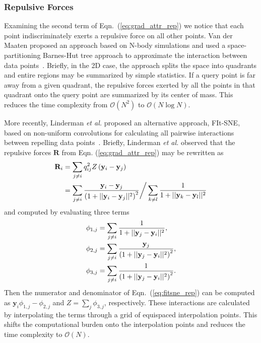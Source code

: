 \documentclass[twocolumn]{bmcart}
\begin{document}
\subsubsection*{Repulsive Forces}

Examining the second term of Eqn.~(\ref{eq:grad_attr_rep}) we notice that each
point indiscriminately exerts a repulsive force on all other points. Van der
Maaten proposed an approach based on N-body simulations and used a
space-partitioning Barnes-Hut tree approach to approximate the interaction
between data points~\cite{van2014accelerating}. Briefly, in the 2D case, the approach splits
the space into quadrants and entire regions may be summarized by simple statistics.
If a query point is far away from a given quadrant, the repulsive forces exerted
by all the points in that quadrant onto the query point are summarized by its center of mass. This
reduces the time complexity from $\mathcal{O}(N^2)$ to
$\mathcal{O}(N \log N)$.

More recently, Linderman \textit{et al.} proposed an alternative approach,
FIt-SNE, based on non-uniform convolutions for calculating all pairwise
interactions between repelling data points~\cite{linderman2019fast}. Briefly,
Linderman \textit{et al.} observed that the repulsive forces $\mathbf{R}$ from Eqn. (\ref{eq:grad_attr_rep}) may
be rewritten as \begin{align}
\mathbf{R}_i &= \sum_{j \neq i} q_{ij}^2 Z \left ( \mathbf{y}_i - \mathbf{y}_j \right ) \notag \\
&= \sum_{j \neq i} \frac{\mathbf{y}_i - \mathbf{y}_j}{\left ( 1 + || \mathbf{y}_i - \mathbf{y}_j ||^2 \right )^{2}}
\bigg/
\sum_{k \neq l} \frac{1}{1 + || \mathbf{y}_k - \mathbf{y}_l || ^2} \label{eq:fitsne_rep}
\end{align} 
and computed by evaluating three terms
\begin{align}
\phi_{1, j} &= \sum_{j \neq i} \frac{1}{1 + || \mathbf{y}_j - \mathbf{y}_i ||^2}, \notag \\
\phi_{2, j} &= \sum_{j \neq i} \frac{\mathbf{y}_j}{\left( 1 + || \mathbf{y}_j - \mathbf{y}_i ||^2 \right)^2}, \notag \\
\phi_{3, j} &= \sum_{j \neq i} \frac{1}{\left( 1 + || \mathbf{y}_j - \mathbf{y}_i ||^2 \right)^2}. \label{eq:fitsne_terms}
\end{align}
Then the numerator and denominator of Eqn.~(\ref{eq:fitsne_rep}) can be
computed as $\mathbf{y}_i \phi_{1,j} - \phi_{2,j}$ and $Z = \sum_j \phi_{3,j}$,
respectively. These interactions are calculated by interpolating the terms
through a grid of equispaced interpolation points. This shifts the
computational burden onto the interpolation points and reduces the time
complexity to $\mathcal{O}(N)$.
\end{document}
